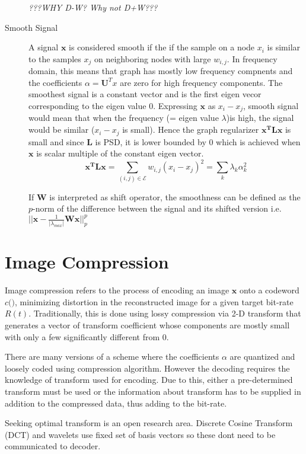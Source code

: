 \documentclass[10pt,a4paper, nocenter]{report}
\begin{document}
\begin{description}
	\textit{???WHY D-W? Why not D+W???}
	
	\item [Smooth Signal] A signal $\mathbf{x}$ is considered smooth if the if the sample on a node $x_{i}$ is similar to the samples $x_{j}$ on neighboring nodes with large $w_{i,j}$. In frequency domain, this means that graph has mostly low frequency compnents and the coefficients $\alpha = \mathbf{U}^{T}x$ are zero for high frequency components. The smoothest signal is a constant vector and is the first eigen vecor corresponding to the eigen value 0. Expressing $\mathbf{x}$ as $x_{i}-x_{j}$, smooth signal would mean that when the frequency (= eigen value $\lambda$)is high, the signal would be similar ($x_{i}-x_{j}$ is small). Hence the graph regularizer $\mathbf{x^{T}Lx}$ is small and since $\mathbf{L}$ is PSD, it is lower bounded by 0 which is achieved when $\mathbf{x}$ is scalar multiple of the constant eigen vector.
	$$ \mathbf{x^{T}Lx} = \sum_{(i,j)\in \mathcal{E}}w_{i,j}(x_{i}-x_{j})^2 = \sum_{k}\lambda_{k}\alpha_{k}^2 $$
	
	If $\mathbf{W}$ is interpreted as shift operator, the smoothness can be defined as the $p$-norm of the difference between the signal and its shifted version i.e. $\lvert\lvert \mathbf{x}-\frac{1}{\lvert \lambda_{max}\rvert}
	\mathbf{Wx}\rvert\rvert_{p}^p$
	\end{description}
	
	\chapter*{Image Compression}
	\thispagestyle{fancy}
	Image compression refers to the process of encoding an image $\mathbf{x}$ onto a codeword $c(\mathbf)$, minimizing distortion in the reconstructed image for a given target bit-rate $R(t)$. Traditionally, this is done using lossy compression via 2-D transform that generates a vector of transform coefficient whose components are mostly small with only a few significantly different from 0. 

	There are many versions of a scheme where the coefficients $\alpha$ are quantized and loosely coded using compression algorithm. However the decoding requires the knowledge of transform used for encoding. Due to this, either a pre-determined transform must be used or the information about transform has to be supplied in addition to the compressed data, thus adding to the bit-rate. 
	
	Seeking optimal transform is an open research area. Discrete Cosine Transform (DCT) and wavelets use fixed set of basis vectors so these dont need to be communicated to decoder. 
	
\end{document}

